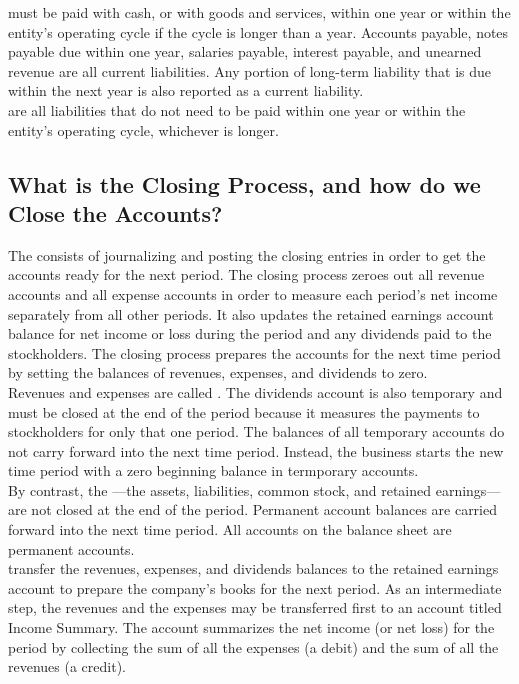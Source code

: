 \documentclass{article}
\begin{document}
 must be paid with cash, or with goods and services, within one year or within the entity's operating cycle if the cycle is longer than a year. Accounts payable, notes payable due within one year, salaries payable, interest payable, and unearned revenue are all current liabilities. Any portion of long-term liability that is due within the next year is also reported as a current liability. \\ 

 are all liabilities that do not need to be paid within one year or within the entity's operating cycle, whichever is longer. 

\subsection{What is the Closing Process, and how do we Close the Accounts?}

The  consists of journalizing and posting the closing entries in order to get the accounts ready for the next period. The closing process zeroes out all revenue accounts and all expense accounts in order to measure each period's net income separately from all other periods. It also updates the retained earnings account balance for net income or loss during the period and any dividends paid to the stockholders. The closing process prepares the accounts for the next time period by setting the balances of revenues, expenses, and dividends to zero. \\ 

Revenues and expenses are called . The dividends account is also temporary and must be closed at the end of the period because it measures the payments to stockholders for only that one period. The balances of all temporary accounts do not carry forward into the next time period. Instead, the business starts the new time period with a zero beginning balance in termporary accounts. \\ 

By contrast, the ---the assets, liabilities, common stock, and retained earnings---are not closed at the end of the period. Permanent account balances are carried forward into the next time period. All accounts on the balance sheet are permanent accounts. \\ 

 transfer the revenues, expenses, and dividends balances to the retained earnings account to prepare the company's books for the next period. As an intermediate step, the revenues and the expenses may be transferred first to an account titled Income Summary. The  account summarizes the net income (or net loss) for the period by collecting the sum of all the expenses (a debit) and the sum of all the revenues (a credit). 
\end{document}
